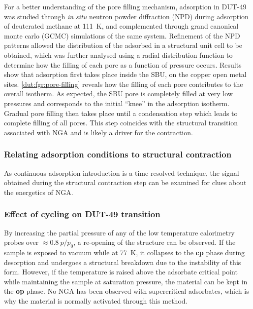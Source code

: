For a better understanding of the pore filling mechanism, adsorption
in DUT-49 was studied through \textit{in situ} neutron powder diffraction
(NPD) during adsorption of deuterated methane  at \SI{111}{\kelvin},
and complemented through grand canonical monte carlo (GCMC) simulations
of the same system. Refinement of the NPD patterns allowed the distribution
of the adsorbed  in a structural unit cell to be obtained, which
was further analysed using a radial distribution function to determine
how the filling of each pore as a function of pressure occurs. 
Results show that adsorption first takes place inside the SBU,
on the copper open metal sites. 
\autoref{dut:fgr:pore-filling} reveals how
the filling of each pore contributes to the overall isotherm.
As expected, the SBU pore is completely filled at very low pressures
and corresponds to the initial ``knee'' in the adsorption isotherm. Gradual
pore filling then takes place until a condensation step which 
leads to complete filling of all pores. This step coincides with 
the structural transition associated with NGA and is likely a driver 
for the contraction.

\subsubsection{Relating adsorption conditions to structural contraction}

As continuous adsorption introduction is a time-resolved technique, 
the signal obtained during the structural contraction step can 
be examined for clues about the energetics of NGA. 



\subsubsection{Effect of cycling on DUT-49 transition}

By increasing the partial pressure of any of the low temperature 
calorimetry probes over \(\approx 0.8~p/p_0\), a re-opening
of the structure can be observed. If the sample is exposed to 
vacuum while at \SI{77}{\kelvin}, it collapses to the \textbf{cp}
phase during desorption and undergoes a structural breakdown 
due to the instability of this form. However, if the temperature 
is raised above the adsorbate critical point while maintaining the
sample at saturation pressure, the material can be kept in the 
\textbf{op} phase. No NGA has been observed with supercritical 
adsorbates, which is why the material is normally activated through
this method. 

